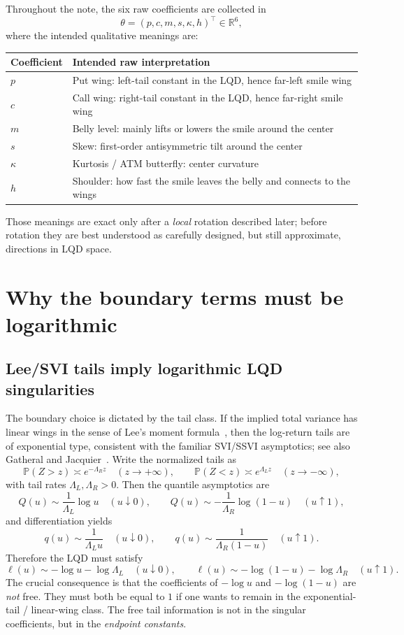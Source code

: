 \documentclass[11pt]{article}
\newcommand{\R}{\mathbb{R}}
\begin{document}
Throughout the note, the six raw coefficients are collected in
\[
\theta = (p,c,m,s,\kappa,h)^\top \in \R^6,
\]
where the intended qualitative meanings are:
\begin{center}
\begin{tabular}{>{\raggedright\arraybackslash}p{2.0cm}p{10.2cm}}
\toprule
Coefficient & Intended raw interpretation \\
\midrule
$p$ & Put wing: left-tail constant in the LQD, hence far-left smile wing \\
$c$ & Call wing: right-tail constant in the LQD, hence far-right smile wing \\
$m$ & Belly level: mainly lifts or lowers the smile around the center \\
$s$ & Skew: first-order antisymmetric tilt around the center \\
$\kappa$ & Kurtosis / ATM butterfly: center curvature \\
$h$ & Shoulder: how fast the smile leaves the belly and connects to the wings \\
\bottomrule
\end{tabular}
\end{center}
Those meanings are exact only after a \emph{local} rotation described later; before rotation they are best understood as carefully designed, but still approximate, directions in LQD space.

\section{Why the boundary terms must be logarithmic}
\subsection{Lee/SVI tails imply logarithmic LQD singularities}
The boundary choice is dictated by the tail class. If the implied total variance has linear wings in the sense of Lee's moment formula~\cite{Lee2004}, then the log-return tails are of exponential type, consistent with the familiar SVI/SSVI asymptotics; see also Gatheral and Jacquier~\cite{GatheralJacquier2014}. Write the normalized tails as
\[
\mathbb{P}(Z > z) \asymp e^{-\Lambda_R z} \quad (z \to +\infty),
\qquad
\mathbb{P}(Z < z) \asymp e^{\Lambda_L z} \quad (z \to -\infty),
\]
with tail rates $\Lambda_L,\Lambda_R > 0$. Then the quantile asymptotics are
\[
Q(u) \sim \frac{1}{\Lambda_L}\log u \quad (u \downarrow 0),
\qquad
Q(u) \sim -\frac{1}{\Lambda_R}\log(1-u) \quad (u \uparrow 1),
\]
and differentiation yields
\[
q(u) \sim \frac{1}{\Lambda_L u} \quad (u \downarrow 0),
\qquad
q(u) \sim \frac{1}{\Lambda_R (1-u)} \quad (u \uparrow 1).
\]
Therefore the LQD must satisfy
\begin{equation}
\ell(u)
\sim -\log u - \log \Lambda_L \quad (u \downarrow 0),
\qquad
\ell(u)
\sim -\log(1-u) - \log \Lambda_R \quad (u \uparrow 1).
\label{eq:lqd-endpoints}
\end{equation}
The crucial consequence is that the coefficients of $-\log u$ and $-\log(1-u)$ are \emph{not} free. They must both be equal to $1$ if one wants to remain in the exponential-tail / linear-wing class. The free tail information is not in the singular coefficients, but in the \emph{endpoint constants}.
\end{document}
